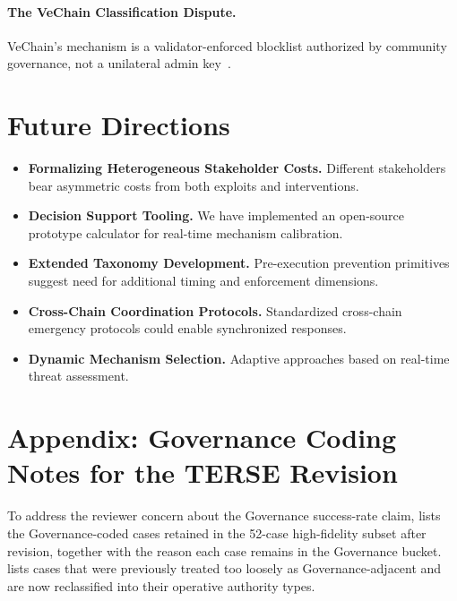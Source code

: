 \documentclass[12pt]{article}
\begin{document}
\paragraph{The VeChain Classification Dispute.}
VeChain's mechanism is a validator-enforced blocklist authorized by community governance, not a unilateral admin key~\cite{ByBit2025SecurityReport,VeChain2025Refutation}.


\section{Future Directions}
\label{subsec:future}

\begin{itemize}
\item \textbf{Formalizing Heterogeneous Stakeholder Costs.} Different stakeholders bear asymmetric costs from both exploits and interventions.
\item \textbf{Decision Support Tooling.} We have implemented an open-source prototype calculator for real-time mechanism calibration.
\item \textbf{Extended Taxonomy Development.} Pre-execution prevention primitives suggest need for additional timing and enforcement dimensions.
\item \textbf{Cross-Chain Coordination Protocols.} Standardized cross-chain emergency protocols could enable synchronized responses.
\item \textbf{Dynamic Mechanism Selection.} Adaptive approaches based on real-time threat assessment.
\end{itemize}

\fi

\ifdefined\terseversion
\section{Appendix: Governance Coding Notes for the TERSE Revision}
\label{app:governance-coding}

To address the reviewer concern about the Governance success-rate claim,  lists the Governance-coded cases retained in the 52-case high-fidelity subset after revision, together with the reason each case remains in the Governance bucket.  lists cases that were previously treated too loosely as Governance-adjacent and are now reclassified into their operative authority types.
\end{document}
